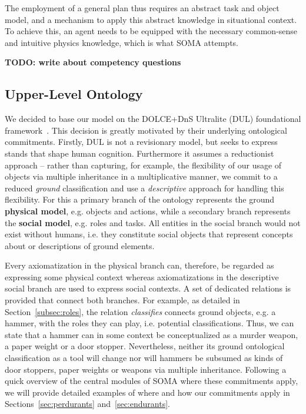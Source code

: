 The employment of a general plan thus requires an abstract task and object model, and a mechanism to apply this abstract knowledge in situational context.
To achieve this, an agent needs to be equipped with the necessary common-sense and intuitive physics knowledge, which is what SOMA attempts.

\textbf{TODO: write about competency questions}

\subsection{Upper-Level Ontology}
\label{sec:narrative:commitments}

We decided to base our model on the DOLCE+DnS Ultralite (DUL) foundational framework~\cite{DOLCE2003}.
This decision is greatly motivated by their underlying ontological commitments.
Firstly, DUL is not a revisionary model, but seeks to express stands that shape human cognition. Furthermore it assumes a reductionist approach -- rather than capturing, for example, the flexibility of our usage of objects via multiple inheritance in a multiplicative manner, we commit to a reduced {\it ground} classification and use a {\it descriptive} approach for handling this flexibility. For this a primary branch of the ontology represents the ground {\bf physical model}, e.g. objects and actions, while a secondary branch represents the {\bf social model}, e.g. roles and tasks. All entities in the social branch would not exist without humans, i.e. they constitute social objects that represent concepts about or descriptions of ground elements. 

Every axiomatization in the physical branch can, therefore, be regarded as expressing some physical context whereas axiomatizations in the descriptive social branch are used to express social contexts. A set of dedicated relations is provided that connect both branches. For example, as detailed in Section~\ref{subsec:roles}, the relation \emph{classifies} connects ground objects, e.g. a hammer, with the roles they can play, i.e. potential classifications. Thus, we can state that a hammer can in some context be conceptualized as a murder weapon, a paper weight or a door stopper. Nevertheless, neither its ground ontological classification as a tool will change nor will hammers be subsumed as kinds of door stoppers, paper weights or weapons via multiple inheritance. Following a quick overview of the central modules of SOMA where these commitments apply, we will provide detailed examples of where and how our commitments apply in Sections~\ref{sec:perdurants} and~\ref{sec:endurants}.

